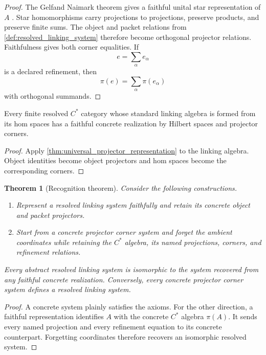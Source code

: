 \documentclass{aomart}
\newtheorem{theorem}{Theorem}[section]
\theoremstyle{definition}
\theoremstyle{remark}
\newcommand{\Rcite}[1]{\cite{#1}}
\begin{document}
\begin{proof}
The Gelfand Naimark theorem gives a faithful unital star representation of \(A\) \Rcite{R1}. Star homomorphisms carry projections to projections, preserve products, and preserve finite sums. The object and packet relations from \cref{def:resolved_linking_system} therefore become orthogonal projector relations. Faithfulness gives both corner equalities. If
\[
 e=\sum_\alpha e_\alpha
\]
is a declared refinement, then
\[
 \pi(e)=\sum_\alpha\pi(e_\alpha)
\]
with orthogonal summands.
\end{proof}

\begin{corollary}\label{cor:resolved_categories}
Every finite resolved \(C^*\) category whose standard linking algebra is formed from its hom spaces has a faithful concrete realization by Hilbert spaces and projector corners.
\end{corollary}

\begin{proof}
Apply \cref{thm:universal_projector_representation} to the linking algebra. Object identities become object projectors and hom spaces become the corresponding corners.
\end{proof}

\begin{theorem}[Recognition theorem]\label{thm:recognition}
Consider the following constructions.
\begin{enumerate}
\item Represent a resolved linking system faithfully and retain its concrete object and packet projectors.
\item Start from a concrete projector corner system and forget the ambient coordinates while retaining the \(C^*\) algebra, its named projections, corners, and refinement relations.
\end{enumerate}
Every abstract resolved linking system is isomorphic to the system recovered from any faithful concrete realization. Conversely, every concrete projector corner system defines a resolved linking system.
\end{theorem}

\begin{proof}
A concrete system plainly satisfies the axioms. For the other direction, a faithful representation identifies \(A\) with the concrete \(C^*\) algebra \(\pi(A)\). It sends every named projection and every refinement equation to its concrete counterpart. Forgetting coordinates therefore recovers an isomorphic resolved system.
\end{proof}
\end{document}
